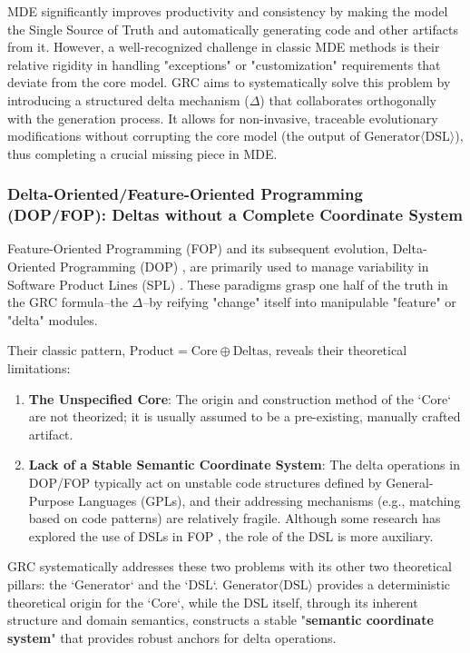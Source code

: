 \documentclass[11pt]{article}
\begin{document}
MDE significantly improves productivity and consistency by making the model the Single Source of Truth and automatically generating code and other artifacts from it. However, a well-recognized challenge in classic MDE methods is their relative rigidity in handling "exceptions" or "customization" requirements that deviate from the core model. GRC aims to systematically solve this problem by introducing a structured delta mechanism ($\Delta$) that collaborates orthogonally with the generation process. It allows for non-invasive, traceable evolutionary modifications without corrupting the core model (the output of $\text{Generator}\langle\text{DSL}\rangle$), thus completing a crucial missing piece in MDE.

\subsubsection{Delta-Oriented/Feature-Oriented Programming (DOP/FOP): Deltas without a Complete Coordinate System}

Feature-Oriented Programming (FOP) \cite{batory2004} and its subsequent evolution, Delta-Oriented Programming (DOP) \cite{schaefer2010}, are primarily used to manage variability in Software Product Lines (SPL) \cite{pohl2005}. These paradigms grasp one half of the truth in the GRC formula--the $\Delta$--by reifying "change" itself into manipulable "feature" or "delta" modules.

Their classic pattern, $\text{Product} = \text{Core} \oplus \text{Deltas}$, reveals their theoretical limitations:
\begin{enumerate}
    \item \textbf{The Unspecified Core}: The origin and construction method of the `Core` are not theorized; it is usually assumed to be a pre-existing, manually crafted artifact.
    \item \textbf{Lack of a Stable Semantic Coordinate System}: The delta operations in DOP/FOP typically act on unstable code structures defined by General-Purpose Languages (GPLs), and their addressing mechanisms (e.g., matching based on code patterns) are relatively fragile. Although some research has explored the use of DSLs in FOP \cite{kaestner2009}, the role of the DSL is more auxiliary.
\end{enumerate}

GRC systematically addresses these two problems with its other two theoretical pillars: the `Generator` and the `DSL`. $\text{Generator}\langle\text{DSL}\rangle$ provides a deterministic theoretical origin for the `Core`, while the DSL itself, through its inherent structure and domain semantics, constructs a stable "\textbf{semantic coordinate system}" that provides robust anchors for delta operations.
\end{document}
